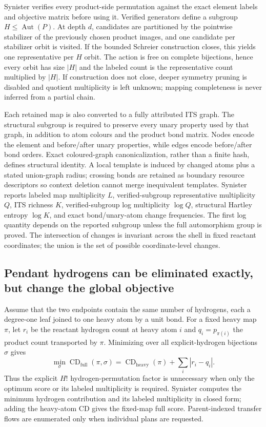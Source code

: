 \documentclass[11pt]{article}
\newcommand{\Aut}{\operatorname{Aut}}
\newcommand{\CD}{\operatorname{CD}}
\begin{document}
Synister verifies every product-side permutation against the exact element
labels and objective matrix before using it.  Verified generators define a
subgroup $H\leq\Aut(P)$.  At depth $d$, candidates are partitioned by the
pointwise stabilizer of the previously chosen product images, and one candidate
per stabilizer orbit is visited.  If the bounded Schreier construction closes,
this yields one representative per $H$ orbit.  The action is free on complete
bijections, hence every orbit has size $|H|$ and the labeled count is the
representative count multiplied by $|H|$.  If construction does not close,
deeper symmetry pruning is disabled and quotient multiplicity is left unknown;
mapping completeness is never inferred from a partial chain.

Each retained map is also converted to a fully attributed ITS graph.  The
structural subgroup is required to preserve every unary property used by that
graph, in addition to atom colours and the product bond matrix.  Nodes
encode the element and before/after unary properties, while edges encode
before/after bond orders.  Exact coloured-graph canonicalization, rather than
a finite hash, defines structural identity.  A local template is induced by
changed atoms plus a stated union-graph radius; crossing bonds are retained as
boundary resource descriptors so context deletion cannot merge inequivalent
templates.  Synister reports labeled map multiplicity $L$, verified-subgroup
representative multiplicity $Q$, ITS richness $K$, verified-subgroup log
multiplicity $\log Q$, structural Hartley entropy $\log K$, and exact
bond/unary-atom change frequencies.  The first log quantity depends on the
reported subgroup unless the full automorphism group is proved.  The
intersection of changes is invariant across the shell in fixed reactant
coordinates; the union is the set of possible coordinate-level changes.

\subsection*{Pendant hydrogens can be eliminated exactly, but change the
global objective}

Assume that the two endpoints contain the same number of hydrogens, each a
degree-one leaf joined to one heavy atom by a unit bond.  For a fixed heavy map
$\pi$, let $r_i$ be the reactant hydrogen count at heavy atom $i$ and
$q_i=p_{\pi(i)}$ the product count transported by $\pi$.  Minimizing over all
explicit-hydrogen bijections $\sigma$ gives
\begin{equation}
 \min_\sigma \CD_{\mathrm{full}}(\pi,\sigma)
 =\CD_{\mathrm{heavy}}(\pi)+\sum_i|r_i-q_i|.
 \label{eq:hydrogen-factorization}
\end{equation}
Thus the explicit $H!$ hydrogen-permutation factor is unnecessary when only
the optimum score or its labeled multiplicity is required.  Synister computes
the minimum hydrogen contribution and its labeled multiplicity in closed form;
adding the heavy-atom CD gives the fixed-map full score.  Parent-indexed
transfer flows are enumerated only when individual plans are requested.
\end{document}
